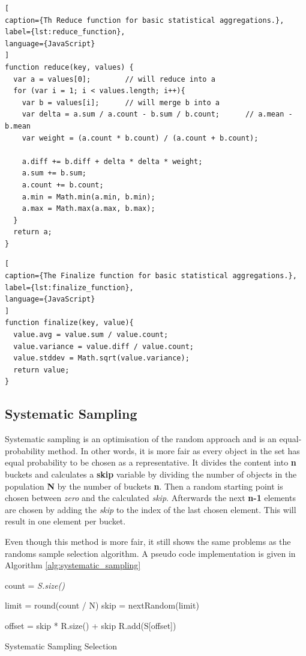 \begin{lstlisting}[
caption={Th Reduce function for basic statistical aggregations.},
label={lst:reduce_function},
language={JavaScript}
]
function reduce(key, values) {
  var a = values[0]; 		// will reduce into a
  for (var i = 1; i < values.length; i++){
    var b = values[i];		// will merge b into a
    var delta = a.sum / a.count - b.sum / b.count;		// a.mean - b.mean
    var weight = (a.count * b.count) / (a.count + b.count);
    
    a.diff += b.diff + delta * delta * weight;
    a.sum += b.sum;
    a.count += b.count;
    a.min = Math.min(a.min, b.min);
    a.max = Math.max(a.max, b.max);
  }
  return a;
}
\end{lstlisting}

\begin{lstlisting}[
caption={The Finalize function for basic statistical aggregations.},
label={lst:finalize_function},
language={JavaScript}
]
function finalize(key, value){
  value.avg = value.sum / value.count;
  value.variance = value.diff / value.count;
  value.stddev = Math.sqrt(value.variance);
  return value;
}
\end{lstlisting}

\subsection{Systematic Sampling}
Systematic sampling is an optimisation of the random approach and is an equal-probability method. In other words, it is more fair as every object in the set has equal probability to be chosen as a representative. It divides the content into \textbf{n} buckets and calculates a \textbf{skip} variable by dividing the number of objects in the population \textbf{N} by the number of buckets \textbf{n}. Then a random starting point is chosen between \textit{zero} and the calculated \textit{skip}. Afterwards the next \textbf{n-1} elements are chosen by adding the \textit{skip} to the index of the last chosen element.  This will result in one element per bucket.

Even though this method is more fair, it still shows the same problems as the randoms sample selection algorithm. A pseudo code implementation is given in Algorithm \ref{alg:systematic_sampling}

\begin{algorithm}[!htb]
\SetAlgoLined
{}

 \BlankLine

 count = \textit{S.size()}\; 
 
 limit = round(count / N)\;
  skip = nextRandom(limit)\;
  
   {
     offset = skip * R.size() + skip\;
     R.add(S[offset])\;
  }
 \caption{Systematic Sampling Selection}
 \label{alg:systematic_sampling}
\end{algorithm}

